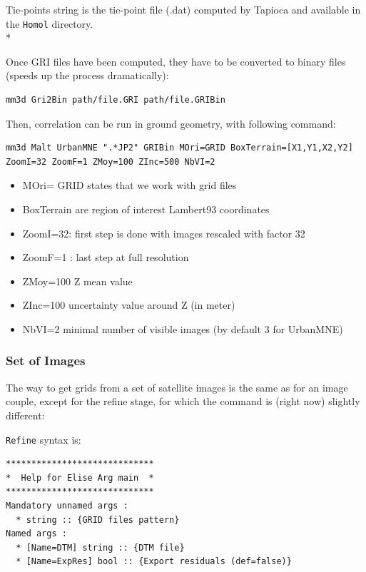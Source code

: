 Tie-points string is the tie-point file (.dat) computed by Tapioca and available in the {\tt Homol} directory.\\*

Once GRI files have been computed, they have to be converted to binary files (speeds up the process dramatically):
\begin{verbatim}
mm3d Gri2Bin path/file.GRI path/file.GRIBin
\end{verbatim}

Then, correlation can be run in ground geometry, with following command:

\begin{verbatim}
mm3d Malt UrbanMNE ".*JP2" GRIBin MOri=GRID BoxTerrain=[X1,Y1,X2,Y2]
ZoomI=32 ZoomF=1 ZMoy=100 ZInc=500 NbVI=2
\end{verbatim}

\begin{itemize}
 \item MOri= GRID states that we work with grid files
 \item   BoxTerrain are region of interest Lambert93 coordinates
 \item   ZoomI=32: first step is done with images rescaled with factor 32
 \item   ZoomF=1 : last step at full resolution
 \item   ZMoy=100  Z mean value
 \item   ZInc=100 uncertainty value around Z (in meter)
 \item   NbVI=2 minimal number of visible images  (by default 3 for UrbanMNE)
\end{itemize}

\subsubsection{Set of Images}

The way to get grids from a set of satellite images is the same as for an image couple, except for the refine stage, for which the command is (right now) slightly different:

{\tt Refine} syntax is:

\begin{verbatim}
*****************************
*  Help for Elise Arg main  *
*****************************
Mandatory unnamed args :
  * string :: {GRID files pattern}
Named args :
  * [Name=DTM] string :: {DTM file}
  * [Name=ExpRes] bool :: {Export residuals (def=false)}
\end{verbatim}

